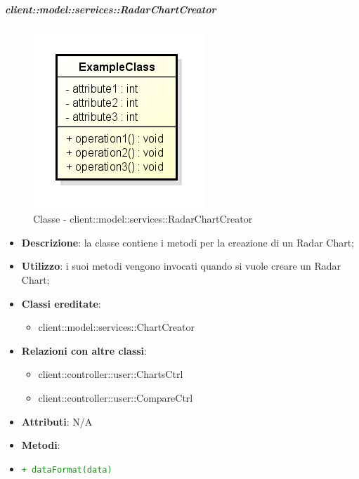 		\subparagraph{client::model::services::RadarChartCreator} %
		\label{subp:radarchartcreator}
			\begin{figure}[htbp]
				\centering
				\centerline{\includegraphics[scale=0.7]{./images/client/classes/example_class.png}}
				\caption{Classe - client::model::services::RadarChartCreator}
			\end{figure}
			\begin{itemize}
				\item \textbf{Descrizione}: la classe contiene i metodi per la creazione di un Radar Chart;
				\item \textbf{Utilizzo}: i suoi metodi vengono invocati quando si vuole creare un Radar Chart;
				\item \textbf{Classi ereditate}:
					\begin{itemize}
						\item client::model::services::ChartCreator
					\end{itemize}
				\item \textbf{Relazioni con altre classi}:
					\begin{itemize}
						\item client::controller::user::ChartsCtrl
						\item client::controller::user::CompareCtrl
					\end{itemize}
				\item \textbf{Attributi}: N/A
				\item \textbf{Metodi}: 
					\item \textcolor{forestgreen}{\texttt{+ dataFormat(data)}}
			\end{itemize}

